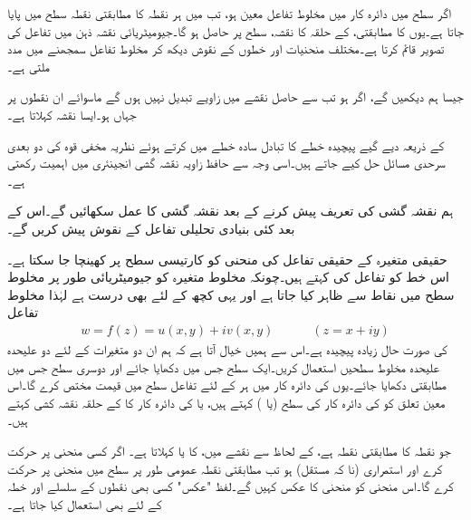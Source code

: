 اگر  سطح میں دائرہ کار  میں مخلوط تفاعل  معین ہو، تب  میں ہر نقطہ کا مطابقتی نقطہ  سطح میں پایا جاتا ہے۔یوں 
 کا مطابقتی،  کے حلقہ کا نقشہ،  سطح پر حاصل ہو گا۔جیومیٹریائی نقشہ ذہن میں تفاعل کی تصویر قائم کرتا ہے۔مختلف منحنیات اور خطوں کے نقوش دیکھ کر مخلوط تفاعل سمجھنے میں مدد ملتی ہے۔

جیسا ہم دیکھیں گے، اگر   ہو تب  سے حاصل نقشے میں زاویے تبدیل نہیں ہوں گے ماسوائے ان نقطوں پر جہاں  ہو۔ایسا نقشہ  کہلاتا ہے۔ 

 کے ذریعہ دیے گیے پیچیدہ خطے کا تبادل سادہ خطے میں کرتے ہوئے نظریہ مخفی قوہ کی دو بعدی سرحدی مسائل حل کیے جاتے ہیں۔اسی وجہ سے حافظ زاویہ نقشہ گشی انجینئری میں اہمیت رکھتی ہے۔

ہم نقشہ گشی کی تعریف پیش کرنے کے بعد نقشہ گشی کا عمل سکھائیں گے۔اس کے بعد کئی بنیادی تحلیلی تفاعل  کے نقوش پیش کریں گے۔

حقیقی متغیرہ  کے حقیقی تفاعل  کی منحنی  کو کارتیسی  سطح پر  کھینچا جا سکتا ہے۔اس خط کو تفاعل کی  کہتے ہیں۔چونکہ مخلوط متغیرہ  کو جیومیٹریائی طور پر مخلوط سطح میں نقاط سے ظاہر کیا جاتا ہے اور یہی کچھ   کے لئے بھی درست ہے لہٰذا مخلوط تفاعل
\begin{align}
w=f(z)=u(x,y)+iv(x,y)\quad \quad \quad (z=x+iy)
\end{align}
کی صورت حال زیادہ پیچیدہ ہے۔اس سے ہمیں خیال آتا ہے کہ ہم ان دو متغیرات کے لئے دو علیحدہ علیحدہ مخلوط سطحیں استعمال کریں۔ایک  سطح جس میں  دکھایا جائے اور دوسری  سطح جس میں مطابقتی  دکھایا جائے۔یوں   کی دائرہ کار  میں ہر   کے لئے تفاعل   سطح    میں قیمت   مختص کرے گا۔اس معین تعلق کو  کی دائرہ کار کی سطح     (یا ) کہتے ہیں، یا  کی دائرہ کار کا  کے حلقہ  نقشہ کشی کہتے ہیں۔

 جو نقطہ  کا مطابقتی نقطہ ہے،   کے لحاظ سے نقشے میں،  کا   یا  کہلاتا ہے۔ اگر  کسی منحنی پر حرکت کرے اور  استمراری (نا کہ مستقل)  ہو تب مطابقتی نقطہ  عمومی طور پر سطح  میں منحنی  پر حرکت کرے گا۔اس منحنی کو منحنی  کا عکس کہیں گے۔لفظ "عکس" کسی بھی نقطوں کے سلسلے اور خطہ کے لئے بھی استعمال کیا جاتا ہے۔ 

